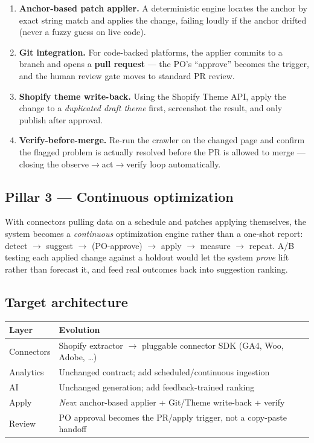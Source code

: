 \documentclass[11pt,a4paper]{article}
\begin{document}
\begin{enumerate}[leftmargin=1.4em]
  \item \textbf{Anchor-based patch applier.} A deterministic engine locates the
  anchor by exact string match and applies the change, failing loudly if the
  anchor drifted (never a fuzzy guess on live code).
  \item \textbf{Git integration.} For code-backed platforms, the applier
  commits to a branch and opens a \textbf{pull request} --- the PO's ``approve''
  becomes the trigger, and the human review gate moves to standard PR review.
  \item \textbf{Shopify theme write-back.} Using the Shopify Theme API, apply
  the change to a \emph{duplicated draft theme} first, screenshot the result,
  and only publish after approval.
  \item \textbf{Verify-before-merge.} Re-run the crawler on the changed page
  and confirm the flagged problem is actually resolved before the PR is allowed
  to merge --- closing the observe$\rightarrow$act$\rightarrow$verify loop
  automatically.
\end{enumerate}

\subsection{Pillar 3 --- Continuous optimization}

With connectors pulling data on a schedule and patches applying themselves, the
system becomes a \emph{continuous} optimization engine rather than a one-shot
report: detect $\rightarrow$ suggest $\rightarrow$ (PO-approve) $\rightarrow$
apply $\rightarrow$ measure $\rightarrow$ repeat. A/B testing each applied change
against a holdout would let the system \emph{prove} lift rather than forecast
it, and feed real outcomes back into suggestion ranking.

\subsection{Target architecture}

\begin{center}
\begin{tabularx}{\textwidth}{@{}l Y@{}}
\toprule
\textbf{Layer} & \textbf{Evolution}\\
\midrule
Connectors & Shopify extractor $\rightarrow$ pluggable connector SDK (GA4, Woo, Adobe, \dots)\\
Analytics & Unchanged contract; add scheduled/continuous ingestion\\
AI & Unchanged generation; add feedback-trained ranking\\
Apply & \emph{New}: anchor-based applier + Git/Theme write-back + verify\\
Review & PO approval becomes the PR/apply trigger, not a copy-paste handoff\\
\bottomrule
\end{tabularx}
\end{center}
\end{document}
